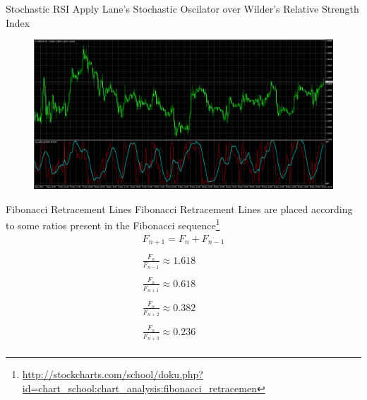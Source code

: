 \documentclass[12pt,portuguese]{beamer}
\begin{document}
\begin{frame}{Stochastic RSI}
	Apply Lane's Stochastic Oscilator over Wilder's Relative Strength Index

	\begin{figure}[H]
	\centering
	\includegraphics[width=\textwidth]{images/mt4_stochRSI.png}
	\end{figure}
\end{frame}

\begin{frame}{Fibonacci Retracement Lines}
	Fibonacci Retracement Lines are placed according to some ratios present in the Fibonacci sequence\footnote{\url{http://stockcharts.com/school/doku.php?id=chart_school:chart_analysis:fibonacci_retracemen}}
\begin{equation*}
\begin{array}{rcl}
	F_{n+1} = F_n + F_{n-1}\\
	\\
	\frac{F_n}{F_{n-1}} \approx 1.618 \\
	\\
	\frac{F_n}{F_{n+1}} \approx 0.618 \\
	\\
	\frac{F_n}{F_{n+2}} \approx 0.382 \\
	\\
	\frac{F_n}{F_{n+3}} \approx 0.236 \\
\end{array}
\end{equation*}
\end{frame}
	
\end{document}
